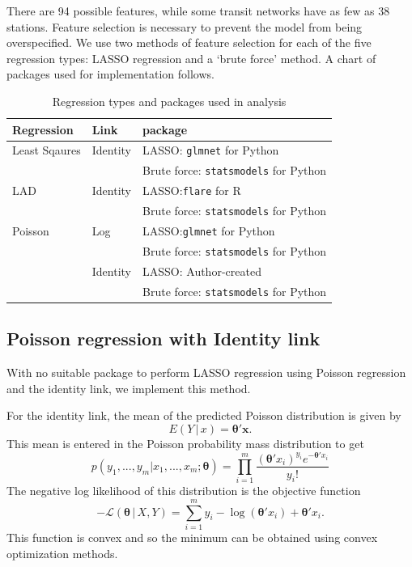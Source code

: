 \documentclass[11pt]{article}
\begin{document}
There are 94 possible features, while some transit networks have as few as 38 stations. Feature selection is necessary to prevent the model from being overspecified. We use two methods of feature selection for each of the five regression types: LASSO regression and a `brute force' method. A chart of packages used for implementation follows.

\begin{table} 
\centering
\begin{tabular}{lll}
\toprule Regression&Link&package\\
\midrule Least Sqaures&Identity&LASSO: \texttt{glmnet} for Python\\
&&Brute force: \texttt{statsmodels} for Python\\
LAD&Identity&LASSO:\texttt{flare} for R\\
&&Brute force: \texttt{statsmodels} for Python\\
Poisson&Log&LASSO:\texttt{glmnet} for Python\\
&&Brute force: \texttt{statsmodels} for Python\\
&Identity&LASSO: Author-created\\
&&Brute force: \texttt{statsmodels} for Python\\
\bottomrule
\end{tabular}
\caption{Regression types and packages used in analysis}
\label{tab:regtype}
\end{table}

\subsection{Poisson regression with Identity link}

With no suitable package to perform LASSO regression using Poisson regression and the identity link, we implement this method.

For the identity link, the mean of the predicted Poisson distribution is given by $$E(Y\,|\,x) = \boldsymbol{\theta}'\mathbf{x}.$$ This mean is entered in the Poisson probability mass distribution to get 
$$p(y_1,...,y_m|x_1,...,x_m;\boldsymbol{\theta}) = \prod_{i=1}^m \frac{\left(\boldsymbol{\theta}'x_i\right)^{y_i}e^{-\boldsymbol{\theta}'x_i}}{y_i!} $$
The negative log likelihood of this distribution is the objective function
$$-\mathcal{L}\left(\boldsymbol{\theta}\,|\,X, Y\right) = \sum_{i=1}^m y_i-\log{\left(\boldsymbol{\theta}'x_i\right)} +\boldsymbol{\theta}'x_i. $$ This function is convex and so the minimum can be obtained using convex optimization methods. 
\end{document}
